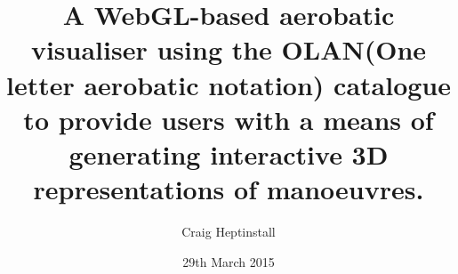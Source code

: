 
\title{A WebGL-based aerobatic visualiser using the OLAN(One letter aerobatic notation) catalogue to provide users with a means of generating interactive 3D representations of manoeuvres.}

\author{Craig Heptinstall}




\date{29th March 2015} %




\maketitle




